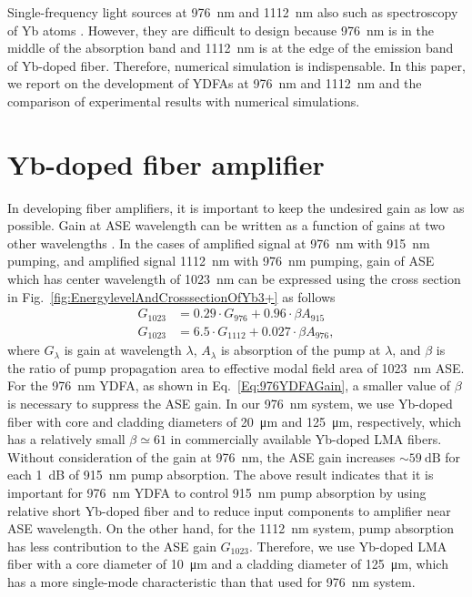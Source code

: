 \documentclass{osa-article}
\begin{document}
Single-frequency light sources at \SI{976}{nm} and \SI{1112}{nm} also such as spectroscopy of Yb atoms  \cite{franzen2018Singlestage}.
However, they are difficult to design because \SI{976}{nm} is in the middle of the absorption band and \SI{1112}{nm} is at the edge of the emission band of Yb-doped fiber.
Therefore, numerical simulation is indispensable.
In this paper, we report on the development of YDFAs at \SI{976}{nm} and \SI{1112}{nm} and the comparison of experimental results with numerical simulations.

\section{Yb-doped fiber amplifier}
In developing fiber amplifiers, it is important to keep the undesired gain as low as possible.
Gain at ASE wavelength can be written as a function of gains at two other wavelengths \cite{nilsson1998Ringdoped}.
In the cases of amplified signal at \SI{976}{nm} with \SI{915}{nm} pumping, and amplified signal \SI{1112}{nm} with \SI{976}{nm} pumping, gain of ASE which has center wavelength of \SI{1023}{nm} can be expressed using the cross section in Fig.~\ref{fig:EnergylevelAndCrosssectionOfYb3+} as follows
\begin{align}
  G_{1023} &= 0.29\cdot G_{976} + 0.96\cdot \beta A_{915} \label{Eq:976YDFAGain}\\
  G_{1023} &= 6.5\cdot G_{1112} + 0.027\cdot \beta A_{976}, \label{Eq:1112YDFAGain}
\end{align}
where $G_{\lambda}$ is gain at wavelength $\lambda$, $A_{\lambda}$ is absorption of the pump at $\lambda$, and $\beta$ is the ratio of pump propagation area to effective modal field area of \SI{1023}{nm} ASE.
For the \SI{976}{nm} YDFA, as shown in Eq.~\eqref{Eq:976YDFAGain}, a smaller value of $\beta$ is necessary to suppress the ASE gain.
In our \SI{976}{nm} system, we use Yb-doped fiber with core and cladding diameters of \SI{20}{\um} and \SI{125}{\um}, respectively, which has a relatively small $\beta \simeq 61$ in commercially available Yb-doped LMA fibers.
Without consideration of the gain at \SI{976}{nm}, the ASE gain increases $\sim \SI{59}{\dB}$ for each \SI{1}{\dB} of \SI{915}{nm} pump absorption.
The above result indicates that it is important for \SI{976}{nm} YDFA to control \SI{915}{nm} pump absorption by using relative short Yb-doped fiber and to reduce input components to amplifier near ASE wavelength.
On the other hand, for the \SI{1112}{nm} system, pump absorption has less contribution to the ASE gain $G_{1023}$.
Therefore, we use Yb-doped LMA fiber with a core diameter of \SI{10}{\um} and a cladding diameter of \SI{125}{\um}, which has a more single-mode characteristic than that used for \SI{976}{nm} system.
\end{document}
